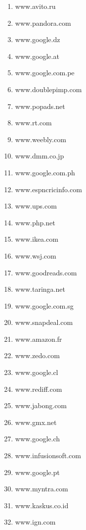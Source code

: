 \begin{enumerate}
\item www.avito.ru
\item www.pandora.com
\item www.google.dz
\item www.google.at
\item www.google.com.pe
\item www.doublepimp.com
\item www.popads.net
\item www.rt.com
\item www.weebly.com
\item www.dmm.co.jp
\item www.google.com.ph
\item www.espncricinfo.com
\item www.ups.com
\item www.php.net
\item www.ikea.com
\item www.wsj.com
\item www.goodreads.com
\item www.taringa.net
\item www.google.com.sg
\item www.snapdeal.com
\item www.amazon.fr
\item www.zedo.com
\item www.google.cl
\item www.rediff.com
\item www.jabong.com
\item www.gmx.net
\item www.google.ch
\item www.infusionsoft.com
\item www.google.pt
\item www.myntra.com
\item www.kaskus.co.id
\item www.ign.com
\end{enumerate}